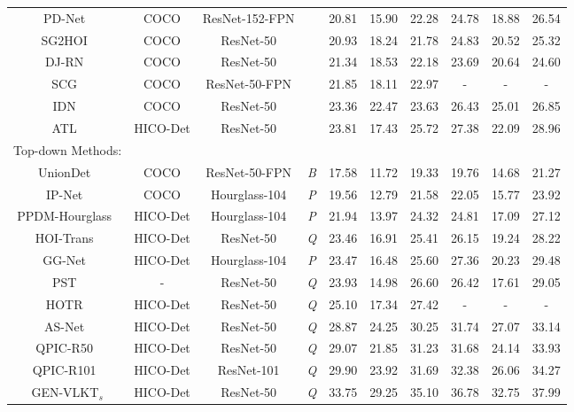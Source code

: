 \documentclass[10pt,twocolumn,letterpaper]{article}
\newcommand{\xmark}{\ding{55}}\newcommand{\cmark}{\ding{51}}
\begin{document}
\begin{table*}[!t]
\begin{center}
{\begin{tabular}{cccc|ccc|ccc}
  
  PD-Net~\cite{zhong2020polysemy}	&COCO	&ResNet-152-FPN	&\xmark			&20.81	&15.90	&22.28       &24.78	&18.88	&26.54\\ 
  SG2HOI~\cite{he2021exploiting}	&COCO	&ResNet-50		&\xmark				&20.93& 18.24 &21.78 &24.83 &20.52& 25.32\\
  DJ-RN~\cite{li2020detailed}		&COCO	&ResNet-50		&\xmark			&21.34	&18.53	&22.18       &23.69	&20.64	&24.60\\
  SCG~\cite{zhang2021spatially}		&COCO	&ResNet-50-FPN		&\xmark			&21.85 &18.11 &22.97      &-& -& - \\
  IDN~\cite{li2020hoi} &COCO &ResNet-50	&\xmark  & 23.36 &22.47 &23.63 &26.43 &25.01 &26.85\\
    ATL~\cite{hou2021affordance}	&HICO-Det	&ResNet-50	&\xmark			&23.81& 17.43 &25.72& 27.38 &22.09 &28.96\\
  \hline 
  Top-down Methods:      &  &               &       & & & &  & &\\
  UnionDet~\cite{Kim2020_unidet}	&COCO		&ResNet-50-FPN	&\emph{B}			&17.58	&11.72	&19.33       &19.76	&14.68	&21.27\\
  IP-Net~\cite{wang2020learning}	&COCO	&Hourglass-104	&\emph{P}				&19.56	&12.79	&21.58      	 &22.05	&15.77	&23.92\\
  PPDM-Hourglass~\cite{liao2020ppdm}	& HICO-Det	&Hourglass-104	&\emph{P}			&21.94	&13.97	&24.32       &24.81	&17.09	&27.12\\
  HOI-Trans~\cite{zou2021_hoitrans}	& HICO-Det	&ResNet-50	&\emph{Q}			&23.46& 16.91& 25.41       &26.15& 19.24& 28.22\\ 
  GG-Net~\cite{zhong2021glance}	&HICO-Det	&Hourglass-104	&\emph{P}		&23.47	&16.48&	25.60&	27.36&	20.23&	29.48\\PST~\cite{dong2021visual}	& -	&ResNet-50	&\emph{Q}			&23.93& 14.98& 26.60& 26.42 &17.61& 29.05\\ 
  HOTR~\cite{Kim_2021_CVPR}	& HICO-Det	&ResNet-50	&\emph{Q}			&25.10& 17.34 &27.42& - & - & -\\ 
  AS-Net~\cite{chen_2021_asnet}		& HICO-Det			&ResNet-50	&\emph{Q}			&28.87	&24.25	&30.25 &31.74	&27.07	&33.14  \\
  QPIC-R50~\cite{tamura2021qpic}		& HICO-Det		&ResNet-50	&\emph{Q}			&29.07	&21.85	&31.23 &31.68	&24.14	&33.93  \\
  QPIC-R101~\cite{tamura2021qpic}		& HICO-Det		&ResNet-101	&\emph{Q}			&29.90	&23.92	&31.69 &32.38	&26.06	&34.27  \\
  \cellcolor{mygray-bg}GEN-VLKT$_s$		& \cellcolor{mygray-bg}HICO-Det		&\cellcolor{mygray-bg}ResNet-50	&\cellcolor{mygray-bg}\emph{Q}				&\cellcolor{mygray-bg}33.75	&\cellcolor{mygray-bg}29.25	&\cellcolor{mygray-bg}35.10      &\cellcolor{mygray-bg}36.78	&\cellcolor{mygray-bg}32.75	&\cellcolor{mygray-bg}37.99 \\

\end{tabular}}
\end{center}
\end{table*}
\end{document}
